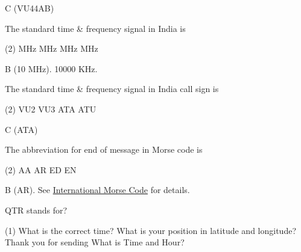 \documentclass[a4paper]{article}
\begin{document}
\begin{solution}
	C (VU44AB)
\end{solution}

\vspace{5mm}



\begin{question}The standard time \& frequency signal in India is
	\begin{tasks}(2)
		 MHz
		 MHz
		 MHz
		 MHz
	\end{tasks}
\end{question}

\begin{solution}
	B (10 MHz). 10000 KHz.
\end{solution}

\vspace{5mm}



\begin{question}The standard time \& frequency signal in India call sign is
	\begin{tasks}(2)
		\task VU2
		\task VU3
		\task ATA
		\task ATU
	\end{tasks}
\end{question}

\begin{solution}
	C (ATA)
\end{solution}

\vspace{5mm}



\begin{question}The abbreviation for end of message in Morse code is
	\begin{tasks}(2)
		\task AA
		\task AR
		\task ED
		\task EN
	\end{tasks}
\end{question}

\begin{solution}
	B (AR). See \href{https://morsecode.scphillips.com/morse.html}{International Morse Code} for details.
\end{solution}

\vspace{5mm}



\begin{question}QTR stands for?
	\begin{tasks}(1)
		\task What is the correct time?
		\task What is your position in latitude and longitude?
		\task Thank you for sending
		\task What is Time and Hour?
	\end{tasks}
\end{question}
\end{document}
